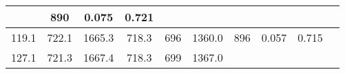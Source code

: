 \documentclass[a4paper,10pt]{article}
\begin{document}
\begin{longtable}{
     |
%    
    c|
%    
    c|
%    
    c|
%    
    c|
%    
    c|
%    
    c|
%    
    c|
%    
    c|
%    
    c|
%    
    c|
%    
    }
%        
        & 890
%        

%        

%        
        & 0.075
%        

%        

%        
        & 0.721
%        

%        
        \\
        \hline

        

%        

%        
        119.1
%        

%        

%        
        & 722.1
%        

%        

%        
        & 1665.3
%        

%        

%        
        & 718.3
%        

%        

%        
        & 696
%        

%        

%        
        & 1360.0
%        

%        

%        
        & 896
%        

%        

%        
        & 0.057
%        

%        

%        
        & 0.715
%        

%        
        \\
        \hline

        

%        

%        
        127.1
%        

%        

%        
        & 721.3
%        

%        

%        
        & 1667.4
%        

%        

%        
        & 718.3
%        

%        

%        
        & 699
%        

%        

%        
        & 1367.0
%        

%        


\end{longtable}
\end{document}
